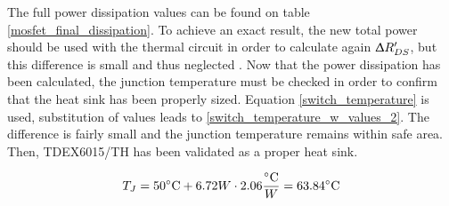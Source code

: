 The full power dissipation values can be found on table \ref{mosfet_final_dissipation}. To achieve an exact result, the new total power should be used with the thermal circuit in order to calculate again $\Updelta R_{DS}'$, but this difference is small and thus neglected . Now that the power dissipation has been calculated, the junction temperature must be checked in order to confirm that the heat sink has been properly sized. Equation \ref{switch_temperature} is used, substitution of values leads to \ref{switch_temperature_w_values_2}. The difference is fairly small and the junction temperature remains within safe area. Then, TDEX6015/TH has been validated as a proper heat sink.

\begin{equation} \label{switch_temperature_w_values_2}
T_{J} = 50 \decC + 6.72 W \cdot  2.06 \frac{\decC}{W} = 63.84 \decC
\end{equation}


